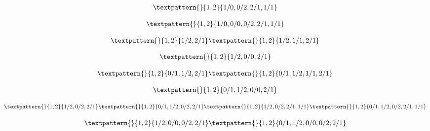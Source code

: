 \begin{equation}
	\begin{gathered}
		\textpattern{}{1,2}{1/0,0/2,2/1,1/1}
	\end{gathered}
	\label{cls:39}
\end{equation}

\begin{equation}
	\begin{gathered}
		\textpattern{}{1,2}{1/0,0/0,0/2,2/1,1/1}
	\end{gathered}
	\label{cls:40}
\end{equation}

\begin{equation}
	\begin{gathered}
		\textpattern{}{1,2}{1/2,2/1}
		\textpattern{}{1,2}{1/2,1/1,2/1}
	\end{gathered}
	\label{cls:41}
\end{equation}

\begin{equation}
	\begin{gathered}
		\textpattern{}{1,2}{1/2,0/0,2/1}
	\end{gathered}
	\label{cls:42}
\end{equation}

\begin{equation}
	\begin{gathered}
		\textpattern{}{1,2}{0/1,1/2,2/1}
		\textpattern{}{1,2}{0/1,1/2,1/1,2/1}
	\end{gathered}
	\label{cls:43}
\end{equation}

\begin{equation}
	\begin{gathered}
		\textpattern{}{1,2}{0/1,1/2,0/0,2/1}
	\end{gathered}
	\label{cls:44}
\end{equation}

\begin{equation}
	\begin{gathered}
		\textpattern{}{1,2}{1/2,0/2,2/1}
		\textpattern{}{1,2}{0/1,1/2,0/2,2/1}
		\textpattern{}{1,2}{1/2,0/2,2/1,1/1}
		\textpattern{}{1,2}{0/1,1/2,0/2,2/1,1/1}
	\end{gathered}
	\label{cls:45}
\end{equation}

\begin{equation}
	\begin{gathered}
		\textpattern{}{1,2}{1/2,0/0,0/2,2/1}
		\textpattern{}{1,2}{0/1,1/2,0/0,0/2,2/1}
	\end{gathered}
	\label{cls:46}
\end{equation}

